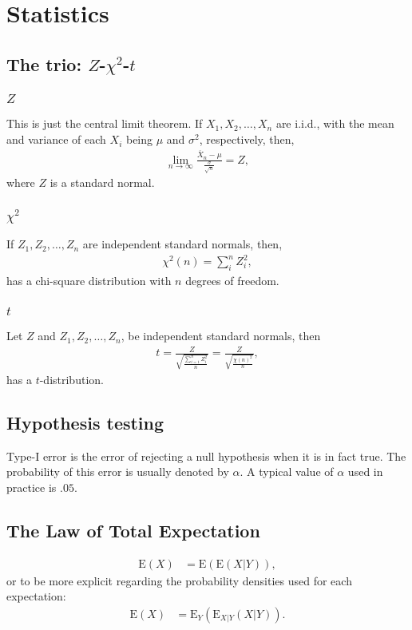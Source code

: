 \documentclass{amsart}
\theoremstyle{plain}
\numberwithin{equation}{section}
\begin{document}
\section{Statistics}

\subsection{The trio: $Z$-$\chi^2$-$t$}
\subsubsection{$Z$}
This is just the central limit theorem. If 
$X_1, X_2, \ldots, X_n$ are i.i.d., with the 
mean and variance of each $X_i$ being $\mu$ and 
$\sigma^2$, respectively, then,
\begin{align*}
\lim_{n \to \infty} \frac{\overline{X}_n-\mu}{\frac{\sigma}{\sqrt{n}}} = Z,
\end{align*}
where $Z$ is a standard normal. 
\subsubsection{$\chi^2$}
If $Z_1, Z_2, \ldots, Z_n$ are independent standard normals,
then, 
\begin{align*}
\chi^2(n) = \sum_{i}^{n} Z_i ^2,
\end{align*}
has a chi-square distribution with $n$ degrees of freedom.

\subsubsection{$t$}
Let $Z$ and $Z_1, Z_2, \ldots, Z_n$, be independent
standard normals, then
\begin{align*}
t = \frac{Z}{\sqrt{\frac{\sum_{i=1}^{n} Z_i ^2}{n}}}
= \frac{Z}{\sqrt{\frac{\chi(n)^2}{n}}},
\end{align*}
has a $t$-distribution. 

\subsection{Hypothesis testing}
Type-I error is the error of 
rejecting a null hypothesis when it 
is in fact true. The probability of this error
is usually denoted by $\alpha$. A typical 
value of $\alpha$ used in practice is 
$.05$.

\subsection{The Law of Total Expectation}
\begin{align*}
\mathrm{E}(X) &= \mathrm{E}(\mathrm{E}(X|Y)),
\end{align*}
or to be more explicit regarding the probability 
densities used for each expectation:
\begin{align*}
\mathrm{E}(X) &= \mathrm{E}_{Y}(\mathrm{E}_{X|Y}(X|Y)).
\end{align*}
\end{document}
